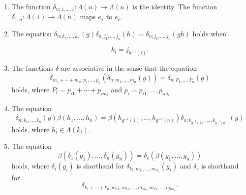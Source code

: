 \begin{thm}
\begin{enumerate}
\item\label{eq5} The function $\delta_{n; 1, \ldots, 1} \colon \Lambda(n) \rightarrow \Lambda(n)$ is the identity. The function $\delta_{1;n} \colon \Lambda(1) \to \Lambda(n)$ maps $e_1$ to $e_n$.

\item\label{eq6} The equation $\delta_{n; k_1, \ldots, k_n}(g) \delta_{n; j_1, \ldots, j_n}(h) = \delta_{n; j_1,\ldots,j_n}(gh)$ holds when

  \[
    k_{i} = j_{h^{-1}(i)}.
  \]
\item\label{eq7} The functions $\delta$ are associative in the sense that the equation
  \[
    \delta_{m_1 + \cdots + m_n; \underline{p_1},\ldots,\underline{p_n}}\left( \delta_{n; m_{1}, \ldots, m_{n}}(g) \right) = \delta_{n; P_{1}, \ldots, P_{n}}(g)
  \]
holds, where $P_{i} = p_{i1} + \cdots + p_{im_{i}}$ and $\underline{p_i} = p_{i1}, \ldots, p_{im_i}$.
\item\label{eq8} The equation
  \[
    \delta_{n;k_1,\ldots,k_n}(g) \beta(h_{1}, \ldots, h_{n}) = \beta(h_{g^{-1}(1)}, \ldots,  h_{g^{-1}(n)}) \delta_{n;k_{g^{-1}(1)},\ldots,k_{g^{-1}(n)}}(g)
  \]
holds, where $h_{i} \in \Lambda(k_{i})$.
\item\label{eq9} The equation
  \[
    \beta(\delta_{1}(g_{1}), \ldots, \delta_{n}(g_{n})) = \delta_{c}(\beta(g_{1}, \ldots, g_{n}))
  \]
holds, where $\delta_{i}(g_{i})$ is shorthand for $\delta_{k_{i}; m_{i1}, \ldots, m_{ik_{i}}}(g_{i})$ and $\delta_{c}$ is shorthand for
  \[
    \delta_{k_{1}+\cdots + k_{n}; m_{11}, m_{12}, \ldots, m_{1k_{1}}, m_{21}, \ldots, m_{nk_{n}}}.
  \]
\end{enumerate}
\end{thm}

